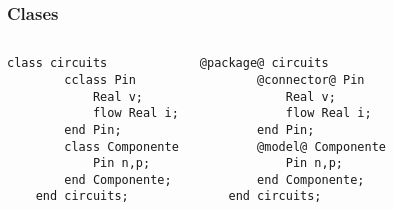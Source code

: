 \documentclass[aspectratio=169,10pt]{beamer}
\begin{document}
\begin{frame}[fragile]
\frametitle{Clases} 
\begin{columns}  
\begin{lstlisting}[frame=single,style=base]
    class circuits
        cclass Pin
            Real v;
            flow Real i;
        end Pin;
        class Componente
            Pin n,p;
        end Componente; 
    end circuits;   
\end{lstlisting}
\par

\begin{lstlisting}[frame=single,style=base]
    @package@ circuits
        @connector@ Pin
            Real v;
            flow Real i;
        end Pin;
        @model@ Componente
            Pin n,p;
        end Componente; 
    end circuits;   
\end{lstlisting}
\par
\end{columns}
\end{frame}
\end{document}
